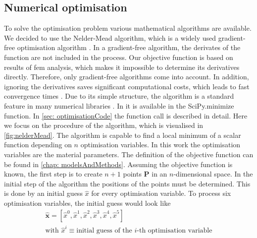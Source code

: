 \subsection{Numerical optimisation} \label{subsec: numericaloptimisation}
To solve the optimisation problem various mathematical algorithms are available. We decided to use the Nelder-Mead algorithm, which is a widely used gradient-free optimisation algorithm \cite{gao_implementing_2012}. In a gradient-free algorithm, the derivates of the function are not included in the process. Our objective function is based on results of \acrshort{fem} analysis, which makes it impossible to determine its derivatives directly. Therefore, only gradient-free algorithms come into account. In addition, ignoring the derivatives saves significant computational costs, which leads to fast convergence times \cite{pham_comparative_2011}. Due to its simple structure, the algorithm is a standard feature in many numerical libraries \cite{singer_efficient_2004}. In  it is available in the SciPy.minimize function. In \autoref{sec: optimisationCode} the function call is described in detail. Here we focus on the procedure of the algorithm, which is visualised in \autoref{fig:nelderMead}. The algorithm is capable to find a local minimum of a scalar function depending on $n$ optimisation variables. In this work the optimisation variables are the material parameters. The definition of the objective function can be found in \autoref{chap: modelsAndMethods}. Assuming the objective function is known, the first step is to create $n+1$ points $\mathbf{P}$ in an $n$-dimensional space. In the initial step of the algorithm the positions of the points must be determined. This is done by an initial guess $\hat{x}$ for every optimisation variable. To process six optimisation variables, the initial guess would look like
\begin{gather*}
    \mathbf{\hat{x}} = [\hat{x}^0, \hat{x}^1, \hat{x}^2, \hat{x}^3, \hat{x}^4, \hat{x}^5] \\
    \text{with } \hat{x}^i \equiv \text{initial guess of the $i$-th optimisation variable}
\end{gather*}

